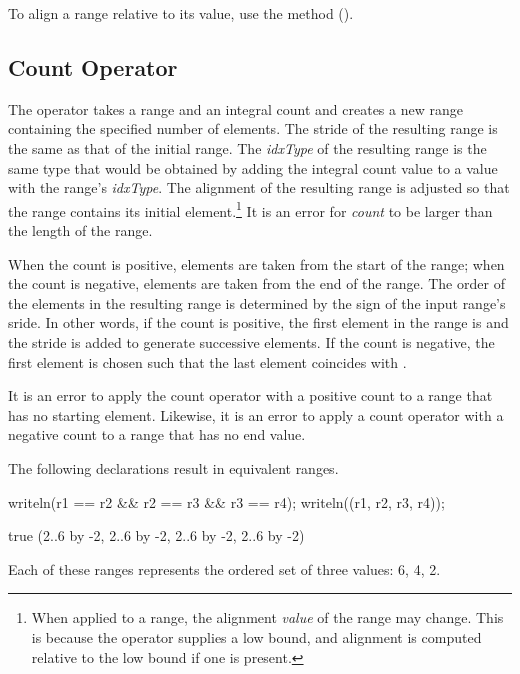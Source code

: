 To align a range relative to its  value, use
the  method ().


\subsection{Count Operator}
\label{Count_Operator}

The \chpl{#} operator takes a range and an integral count and creates a new
range containing the specified number of elements.  
The stride of the resulting range is the same as that of the initial
range.  
The \emph{idxType} of the resulting range is the same type that would be
obtained by adding the integral count value to a value with the
range's \emph{idxType}.  The alignment of the resulting range is adjusted so
that the range contains its initial element.\footnote{When applied to a  range,
the alignment \emph{value} of the range may change.  This is because
the \chpl{#} operator supplies a low bound, and alignment is computed relative
to the low bound if one is present.}
It is an error for \emph{count} to be larger
than the length of the range.

When the count is positive, elements are taken from the start of the range;
when the count is negative, elements are taken from the end of the range.  
The order of the elements in the resulting range is determined by the sign of
the input range's sride.
In other words, if the count is positive, the first element in the 
range  is  and the stride is added to generate
successive elements.  If the count is negative, the first element is chosen such
that the last element coincides with .

It is an error to apply the count operator with a positive count to a range that
has no starting element.  Likewise, it is an error to apply a count operator
with a negative count to a range that has no end value.

\begin{example}
The following declarations result in equivalent ranges.
\begin{chapelpre}
\end{chapelpre}
\begin{chapelpost}
writeln(r1 == r2 \&\& r2 == r3 \&\& r3 == r4);
writeln((r1, r2, r3, r4));
\end{chapelpost}
\begin{chapeloutput}
true
(2..6 by -2, 2..6 by -2, 2..6 by -2, 2..6 by -2)
\end{chapeloutput}
Each of these ranges represents the ordered set of three values: 6, 4, 2.
\end{example}

